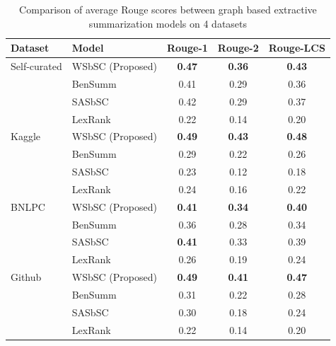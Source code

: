 \documentclass[acmlarge]{acmart}
\begin{document}
\begin{table}[]
	\centering
	\begin{tabular}{llccc} \hline
		Dataset 		& Model                                                & Rouge-1       & Rouge-2       & Rouge-LCS     \\\hline
		Self-curated	& WSbSC (Proposed)                                     & \textbf{0.47} & \textbf{0.36} & \textbf{0.43} \\
		& BenSumm \cite{chowdhury-etal-2021-tfidf-clustering}  & 0.41          & 0.29          & 0.36          \\
		& SASbSC \cite{roychowdhury-etal-2022-spectral-base}   & 0.42          & 0.29          & 0.37          \\
		& LexRank \cite{Erkan-lexRank-2004}                    & 0.22          & 0.14          & 0.20          \\\hline
		Kaggle			& WSbSC (Proposed)                                     & \textbf{0.49} & \textbf{0.43} & \textbf{0.48} \\
		& BenSumm \cite{chowdhury-etal-2021-tfidf-clustering}  & 0.29          & 0.22          & 0.26          \\
		& SASbSC \cite{roychowdhury-etal-2022-spectral-base}   & 0.23          & 0.12          & 0.18          \\
		& LexRank \cite{Erkan-lexRank-2004}                    & 0.24          & 0.16          & 0.22          \\\hline
		BNLPC 			& WSbSC (Proposed)                                     & \textbf{0.41} & \textbf{0.34} & \textbf{0.40} \\
		& BenSumm \cite{chowdhury-etal-2021-tfidf-clustering}  & 0.36          & 0.28          & 0.34          \\
		& SASbSC \cite{roychowdhury-etal-2022-spectral-base}   & \textbf{0.41} & 0.33          & 0.39          \\
		& LexRank \cite{Erkan-lexRank-2004}                    & 0.26          & 0.19          & 0.24          \\\hline
		Github          & WSbSC (Proposed)                                     & \textbf{0.49} & \textbf{0.41} & \textbf{0.47} \\
		& BenSumm \cite{chowdhury-etal-2021-tfidf-clustering}  & 0.31          & 0.22          & 0.28          \\
		& SASbSC \cite{roychowdhury-etal-2022-spectral-base}   & 0.30          & 0.18          & 0.24          \\
		& LexRank \cite{Erkan-lexRank-2004}                    & 0.22          & 0.14          & 0.20          \\\hline
	\end{tabular}
	\caption{Comparison of average Rouge scores between graph based extractive summarization models on 4 datasets}
	\label{tab:result_comparison-1}
\end{table}
\end{document}
